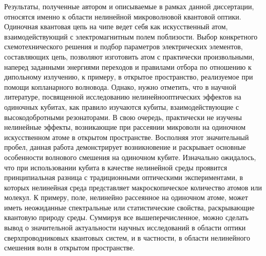  Результаты, полученные автором и описываемые в рамках данной диссертации, относятся именно к области нелинейной микроволновой квантовой оптики. Одиночная квантовая цепь на чипе ведет себя как искусственный атом, взаимодействующий с электромагнитным полем поблизости. Выбор конкретного схемотехнического решения и подбор параметров электрических элементов, составляющих цепь, позволяют изготовить атом с практически произвольными, наперед заданными энергиями переходов и правилами отбора по отношению к дипольному излучению, к примеру, в открытое пространство, реализуемое при помощи копланарного волновода. Однако, нужно отметить, что в научной литературе, посвященной исследованию нелинейнооптических эффектов на одиночных кубитах, как правило  изучаются кубиты, взаимодействующие с высокодобротными резонаторами. В свою очередь, практически не изучены нелинейные эффекты, возникающие при рассеянии микроволн на одиночном искусственном атоме в открытом пространстве. Восполняя этот значительный пробел, данная работа демонстрирует возникновение и раскрывает основные особенности волнового смешения на одиночном кубите. Изначально ожидалось, что при использовании кубита в качестве нелинейной среды проявится принципиальная разница с традиционными оптическими экспериментами, в которых нелинейная среда представляет макроскопическое количество атомов или молекул. К примеру, поле, нелинейно рассеянное на одиночном атоме, может иметь неожиданные спектральные или статистические свойства, раскрывающие квантовую природу среды.  Суммируя все вышеперечисленное, можно сделать вывод о значительной актуальности научных исследований в области оптики сверхпроводниковых квантовых систем, и в частности, в области нелинейного смешения волн в открытом пространстве.

